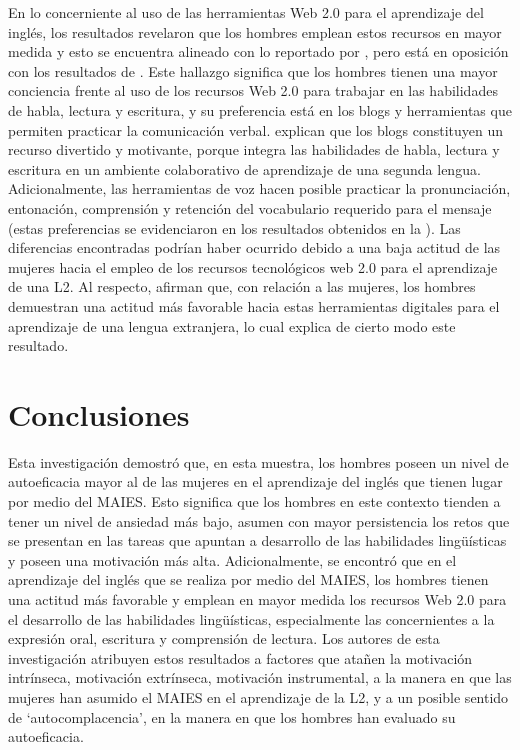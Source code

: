 \documentclass[spanish]{textolivre}
\begin{document}
En lo concerniente al uso de las herramientas Web 2.0 para el aprendizaje del inglés, los resultados revelaron que los hombres emplean estos recursos en mayor medida y esto se encuentra alineado con lo reportado por \textcite{adibi_adoption_2019,kuznetsova_students_2019,azak_analysis_2020,ningsih_gender-based_2022,csizer_gender-related_2024}, pero está en oposición con los resultados de \textcite{jarrah_arab_2021}. Este hallazgo significa que los hombres tienen una mayor conciencia frente al uso de los recursos Web 2.0 para trabajar en las habilidades de habla, lectura y escritura, y su preferencia está en los blogs y herramientas que permiten practicar la comunicación verbal. \textcite{kleanthous_collaboration_2016} explican que los blogs constituyen un recurso divertido y motivante, porque integra las habilidades de habla, lectura y escritura en un ambiente colaborativo de aprendizaje de una segunda lengua. Adicionalmente, las herramientas de voz hacen posible practicar la pronunciación, entonación, comprensión y retención del vocabulario requerido para el mensaje (estas preferencias se evidenciaron en los resultados obtenidos en la ). Las diferencias encontradas podrían haber ocurrido debido a una baja actitud de las mujeres hacia el empleo de los recursos tecnológicos web 2.0 para el aprendizaje de una L2. Al respecto, \textcite{cai_gender_2017} afirman que, con relación a las mujeres, los hombres demuestran una actitud más favorable hacia estas herramientas digitales para el aprendizaje de una lengua extranjera, lo cual explica de cierto modo este resultado.

\section{Conclusiones}\label{sec-modelo}
Esta investigación demostró que, en esta muestra, los hombres poseen un nivel de autoeficacia mayor al de las mujeres en el aprendizaje del inglés que tienen lugar por medio del MAIES. Esto significa que los hombres en este contexto tienden a tener un nivel de ansiedad más bajo, asumen con mayor persistencia los retos que se presentan en las tareas que apuntan a desarrollo de las habilidades lingüísticas y poseen una motivación más alta. Adicionalmente, se encontró que en el aprendizaje del inglés que se realiza por medio del MAIES, los hombres tienen una actitud más favorable y emplean en mayor medida los recursos Web 2.0 para el desarrollo de las habilidades lingüísticas, especialmente las concernientes a la expresión oral, escritura y comprensión de lectura. Los autores de esta investigación atribuyen estos resultados a factores que atañen la motivación intrínseca, motivación extrínseca, motivación instrumental, a la manera en que las mujeres han asumido el MAIES en el aprendizaje de la L2, y a un posible sentido de ‘autocomplacencia’, en la manera en que los hombres han evaluado su autoeficacia. 
\end{document}
